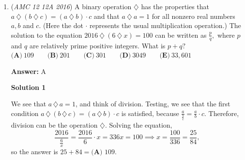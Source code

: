\begin{enumerate}
 Adding up these probabilities 
 \[\frac{1}{16}+\frac{4}{64}+\frac{14}{256}=\frac{23}{128}\] and summing $a$ and $b$, 
 \[a+b=23+128=\boxed{\textbf{(B)}\ 151}\] we get our answer.

 



\textbf{Solution 4}

Notice every $2$ flips, there is a $\dfrac{1}{4}$ chance to go $2$ steps left $(L),$ $\dfrac{1}{2}$ chance to stay put $(P),$ and $\dfrac{1}{4}$ chance to move $2$ steps right $(R).$ We have $4$ choices for how to get to $4:$
 \[RR-1\text{ arrangement}-\dfrac{1}{4}\cdot\dfrac{1}{4}=\dfrac{1}{16}\]
 \[PRR-2\text{ arrangements}-2\cdot\dfrac{1}{2}\cdot\dfrac{1}{4}\cdot\dfrac{1}{4}=\dfrac{1}{16}\]
 \[LRRR-2\text{ arrangements}-2\cdot\dfrac{1}{4}\cdot\dfrac{1}{4}\cdot\dfrac{1}{4}\cdot\dfrac{1}{4}=\dfrac{1}{128}\]
 \[PPRR-3\text{ arrangements}-3\cdot\dfrac{1}{2}\cdot\dfrac{1}{2}\cdot\dfrac{1}{4}\cdot\dfrac{1}{4}=\dfrac{3}{64}\]Finally, our answer will be $\dfrac{1}{16}+\dfrac{1}{16}+\dfrac{1}{128}+\dfrac{3}{64}=\dfrac{23}{128}\implies a+b=\boxed{\textbf{(B)}\ 151}.$



	\item (\textit{AMC 12 12A 2016}) A binary operation $\diamondsuit$ has the properties that $a\ \diamondsuit\ (b\ \diamondsuit\ c) = (a\ \diamondsuit\ b)\cdot c$ and that $a\ \diamondsuit\ a = 1$ for all nonzero real numbers $a, b$ and $c.$ (Here the dot  $\cdot$  represents the usual multiplication operation.) The solution to the equation $2016\ \diamondsuit\ (6\ \diamondsuit\ x) = 100$ can be written as $\frac{p}{q},$ where $p$ and $q$ are relatively prime positive integers. What is $p + q?$
$\textbf{(A)}\ 109\qquad\textbf{(B)}\ 201\qquad\textbf{(C)}\ 301\qquad\textbf{(D)}\ 3049\qquad\textbf{(E)}\ 33,601$

 \textbf{Answer: }A



\textbf{Solution 1}

We see that $a \, \diamondsuit \, a = 1$, and think of division. Testing, we see that the first condition $a \, \diamondsuit \, (b \, \diamondsuit \, c) = (a \, \diamondsuit \, b) \cdot c$ is satisfied, because $\frac{a}{\frac{b}{c}} = \frac{a}{b} \cdot c$. Therefore, division can be the operation $\diamondsuit$. Solving the equation, 
 \[\frac{2016}{\frac{6}{x}} = \frac{2016}{6} \cdot x = 336x = 100\implies x=\frac{100}{336} = \frac{25}{84},\] so the answer is $25 + 84 = \boxed{\textbf{(A) }109}$.


\end{enumerate}
